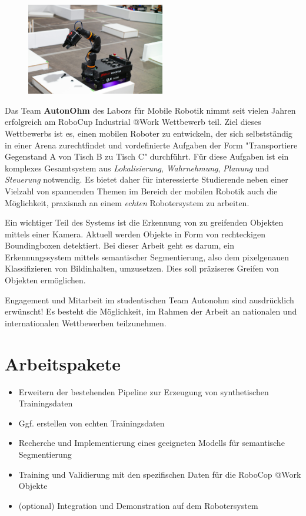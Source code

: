 \documentclass{ohm_project_description}
\begin{document}
\maketitle
\thispagestyle{fancy}

\vspace*{-2.5cm}
\begin{figure}[h!]
    \centering
    \includegraphics[height=4cm]{img/atwork.jpg}
\end{figure} 


Das Team \textbf{AutonOhm} des Labors für Mobile Robotik nimmt seit vielen Jahren erfolgreich am RoboCup Industrial @Work Wettbewerb teil. Ziel dieses Wettbewerbs ist es, einen mobilen Roboter zu entwickeln, der sich selbstständig in einer Arena zurechtfindet und vordefinierte Aufgaben der Form "Transportiere Gegenstand A von Tisch B zu Tisch C" durchführt. Für diese Aufgaben ist ein komplexes Gesamtsystem aus \emph{Lokalisierung}, \emph{Wahrnehmung}, \emph{Planung} und \emph{Steuerung} notwendig. Es bietet daher für interessierte Studierende neben einer Vielzahl von spannenden Themen im Bereich der mobilen Robotik auch die Möglichkeit, praxisnah an einem \emph{echten} Robotersystem zu arbeiten.

Ein wichtiger Teil des Systems ist die Erkennung von zu greifenden Objekten mittels einer Kamera. Aktuell werden Objekte in Form von rechteckigen Boundingboxen detektiert. Bei dieser Arbeit geht es darum, ein Erkennungssystem mittels semantischer Segmentierung, also dem pixelgenauen Klassifizieren von Bildinhalten, umzusetzen. Dies soll präziseres Greifen von Objekten ermöglichen. 

Engagement und Mitarbeit im studentischen Team Autonohm sind ausdrücklich erwünscht! Es besteht die Möglichkeit, im Rahmen der Arbeit an nationalen und internationalen Wettbewerben teilzunehmen.

\section*{Arbeitspakete}
\begin{itemize}[leftmargin=0.5cm]
    \setlength\itemsep{.1em}
    \item Erweitern der bestehenden Pipeline zur Erzeugung von synthetischen Trainingsdaten
    \item Ggf. erstellen von echten Trainingsdaten
    \item Recherche und Implementierung eines geeigneten Modells für semantische Segmentierung 
    \item Training und Validierung mit den spezifischen Daten für die RoboCop @Work Objekte
    \item (optional) Integration und Demonstration auf dem Robotersystem 
\end{itemize}
\end{document}

